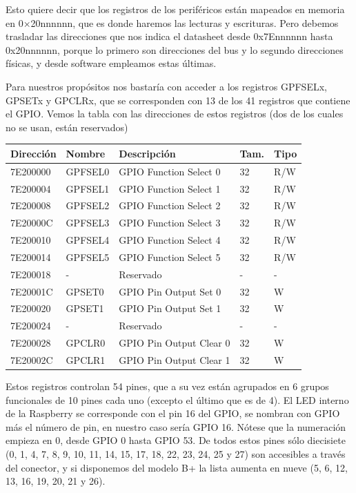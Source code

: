 Esto quiere decir que los registros de los periféricos están mapeados en memoria en
0×20nnnnnn, que es donde haremos las lecturas y escrituras. Pero debemos
trasladar las direcciones que nos indica el datasheet desde 0x7Ennnnnn hasta 0x20nnnnnn,
porque lo primero son direcciones del bus y lo segundo direcciones físicas, y desde
software empleamos estas últimas.

Para nuestros propósitos nos bastaría con acceder a los registros GPFSELx, GPSETx y GPCLRx,
que se corresponden con 13 de los 41 registros que contiene el GPIO. Vemos la tabla con las
direcciones de estos registros (dos de los cuales no se usan, están reservados)

\begin{longtable}{ p{1.8cm} | p{2cm} | p{5cm} | p{1cm} | p{1cm} }
\hline
{\bf Dirección} & {\bf Nombre} & {\bf Descripción} & {\bf Tam.} & {\bf Tipo} \\ \hline
7E200000 & GPFSEL0 & GPIO Function Select 0 & 32 & R/W \\ \hline
7E200004 & GPFSEL1 & GPIO Function Select 1 & 32 & R/W \\ \hline
7E200008 & GPFSEL2 & GPIO Function Select 2 & 32 & R/W \\ \hline
7E20000C & GPFSEL3 & GPIO Function Select 3 & 32 & R/W \\ \hline
7E200010 & GPFSEL4 & GPIO Function Select 4 & 32 & R/W \\ \hline
7E200014 & GPFSEL5 & GPIO Function Select 5 & 32 & R/W \\ \hline
7E200018 & -       & Reservado              & -  & -   \\ \hline
7E20001C & GPSET0  & GPIO Pin Output Set 0  & 32 & W   \\ \hline
7E200020 & GPSET1  & GPIO Pin Output Set 1  & 32 & W   \\ \hline
7E200024 & -       & Reservado              & -  & -   \\ \hline
7E200028 & GPCLR0  & GPIO Pin Output Clear 0 & 32 & W  \\ \hline
7E20002C & GPCLR1  & GPIO Pin Output Clear 1 & 32 & W  \\ \hline
\end{longtable}

Estos registros controlan 54 pines, que a su vez están agrupados
en 6 grupos funcionales de 10 pines cada uno (excepto el último
que es de 4). El LED interno de la
Raspberry se corresponde con el pin 16 del GPIO, se nombran con
GPIO más el número de pin, en nuestro caso sería GPIO 16. Nótese
que la numeración empieza en 0, desde GPIO 0 hasta GPIO 53. De
todos estos pines sólo diecisiete (0, 1, 4, 7, 8, 9, 10, 11, 14, 15, 17, 18, 22, 23, 24, 25 y 27)
son accesibles a través del conector, y si disponemos del modelo B+ la lista
aumenta en nueve (5, 6, 12, 13, 16, 19, 20, 21 y 26).

